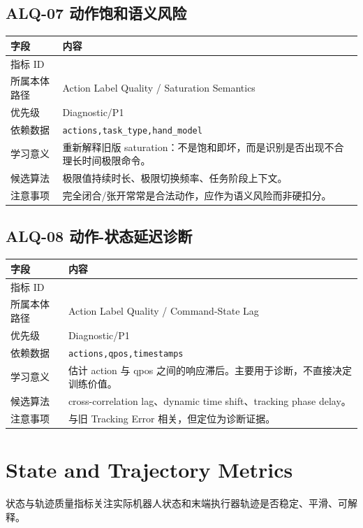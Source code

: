\documentclass[UTF8,zihao=-4,oneside,openany]{ctexrep}
\newcommand{\Code}[1]{\texttt{#1}}
\newcommand{\MID}[1]{\texttt{\seqsplit{#1}}}
\begin{document}
\subsection{ALQ-07 动作饱和语义风险}

\begin{longtable}{L{3.6cm} L{9.6cm}}
\toprule
字段 & 内容 \\
\midrule
指标 ID & \MID{ALQ-07} \\
所属本体路径 & Action Label Quality / Saturation Semantics \\
优先级 & Diagnostic/P1 \\
依赖数据 & \Code{actions,task\_type,hand\_model} \\
学习意义 & 重新解释旧版 saturation：不是饱和即坏，而是识别是否出现不合理长时间极限命令。 \\
候选算法 & 极限值持续时长、极限切换频率、任务阶段上下文。 \\
注意事项 & 完全闭合/张开常常是合法动作，应作为语义风险而非硬扣分。 \\
\bottomrule
\end{longtable}

\subsection{ALQ-08 动作-状态延迟诊断}

\begin{longtable}{L{3.6cm} L{9.6cm}}
\toprule
字段 & 内容 \\
\midrule
指标 ID & \MID{ALQ-08} \\
所属本体路径 & Action Label Quality / Command-State Lag \\
优先级 & Diagnostic/P1 \\
依赖数据 & \Code{actions,qpos,timestamps} \\
学习意义 & 估计 action 与 qpos 之间的响应滞后。主要用于诊断，不直接决定训练价值。 \\
候选算法 & cross-correlation lag、dynamic time shift、tracking phase delay。 \\
注意事项 & 与旧 Tracking Error 相关，但定位为诊断证据。 \\
\bottomrule
\end{longtable}

\section{State and Trajectory Metrics}

状态与轨迹质量指标关注实际机器人状态和末端执行器轨迹是否稳定、平滑、可解释。
\end{document}

